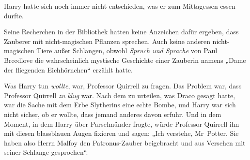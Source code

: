 Harry hatte sich noch immer nicht entschieden, was er zum Mittagessen essen durfte.

Seine Recherchen in der Bibliothek hatten keine Anzeichen dafür ergeben, dass Zauberer mit nicht-magischen Pflanzen sprechen. Auch keine anderen nicht-magischen Tiere außer Schlangen, obwohl \emph{Spruch und Sprache} von Paul Breedlove die wahrscheinlich mystische Geschichte einer Zauberin namens „Dame der fliegenden Eichhörnchen“ erzählt hatte.

Was Harry tun \emph{wollte}, war, Professor Quirrell zu fragen. Das Problem war, dass Professor Quirrell \emph{zu klug} war. Nach dem zu urteilen, was Draco gesagt hatte, war die Sache mit dem Erbe Slytherins eine echte Bombe, und Harry war sich nicht sicher, ob er wollte, dass jemand anderes davon erfuhr. Und in dem Moment, in dem Harry über Parselmünder fragte, würde Professor Quirrell ihn mit diesen blassblauen Augen fixieren und sagen: „Ich verstehe, Mr~Potter, Sie haben also Herrn Malfoy den Patronus-Zauber beigebracht und aus Versehen mit seiner Schlange gesprochen“.

